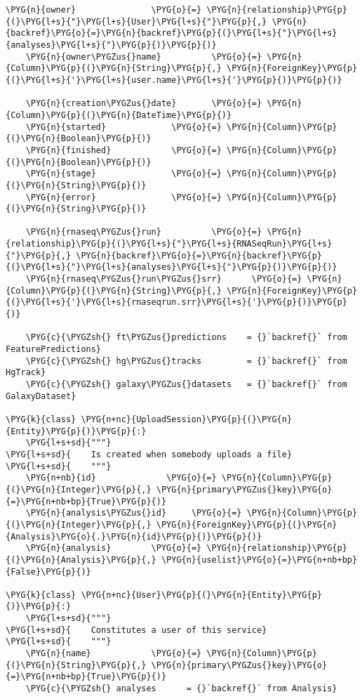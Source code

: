 \begin{Verbatim}[commandchars=\\\{\}]
    \PYG{n}{owner}               \PYG{o}{=} \PYG{n}{relationship}\PYG{p}{(}\PYG{l+s}{"}\PYG{l+s}{User}\PYG{l+s}{"}\PYG{p}{,} \PYG{n}{backref}\PYG{o}{=}\PYG{n}{backref}\PYG{p}{(}\PYG{l+s}{"}\PYG{l+s}{analyses}\PYG{l+s}{"}\PYG{p}{)}\PYG{p}{)}
    \PYG{n}{owner\PYGZus{}name}          \PYG{o}{=} \PYG{n}{Column}\PYG{p}{(}\PYG{n}{String}\PYG{p}{,} \PYG{n}{ForeignKey}\PYG{p}{(}\PYG{l+s}{'}\PYG{l+s}{user.name}\PYG{l+s}{'}\PYG{p}{)}\PYG{p}{)}

    \PYG{n}{creation\PYGZus{}date}       \PYG{o}{=} \PYG{n}{Column}\PYG{p}{(}\PYG{n}{DateTime}\PYG{p}{)}
    \PYG{n}{started}             \PYG{o}{=} \PYG{n}{Column}\PYG{p}{(}\PYG{n}{Boolean}\PYG{p}{)}
    \PYG{n}{finished}            \PYG{o}{=} \PYG{n}{Column}\PYG{p}{(}\PYG{n}{Boolean}\PYG{p}{)}
    \PYG{n}{stage}               \PYG{o}{=} \PYG{n}{Column}\PYG{p}{(}\PYG{n}{String}\PYG{p}{)}
    \PYG{n}{error}               \PYG{o}{=} \PYG{n}{Column}\PYG{p}{(}\PYG{n}{String}\PYG{p}{)}

    \PYG{n}{rnaseq\PYGZus{}run}          \PYG{o}{=} \PYG{n}{relationship}\PYG{p}{(}\PYG{l+s}{"}\PYG{l+s}{RNASeqRun}\PYG{l+s}{"}\PYG{p}{,} \PYG{n}{backref}\PYG{o}{=}\PYG{n}{backref}\PYG{p}{(}\PYG{l+s}{"}\PYG{l+s}{analyses}\PYG{l+s}{"}\PYG{p}{)}\PYG{p}{)}
    \PYG{n}{rnaseq\PYGZus{}run\PYGZus{}srr}      \PYG{o}{=} \PYG{n}{Column}\PYG{p}{(}\PYG{n}{String}\PYG{p}{,} \PYG{n}{ForeignKey}\PYG{p}{(}\PYG{l+s}{'}\PYG{l+s}{rnaseqrun.srr}\PYG{l+s}{'}\PYG{p}{)}\PYG{p}{)}

    \PYG{c}{\PYGZsh{} ft\PYGZus{}predictions    = {}`backref{}` from FeaturePredictions}
    \PYG{c}{\PYGZsh{} hg\PYGZus{}tracks         = {}`backref{}` from HgTrack}
    \PYG{c}{\PYGZsh{} galaxy\PYGZus{}datasets   = {}`backref{}` from GalaxyDataset}

\PYG{k}{class} \PYG{n+nc}{UploadSession}\PYG{p}{(}\PYG{n}{Entity}\PYG{p}{)}\PYG{p}{:}
    \PYG{l+s+sd}{"""}
\PYG{l+s+sd}{    Is created when somebody uploads a file}
\PYG{l+s+sd}{    """}
    \PYG{n+nb}{id}              \PYG{o}{=} \PYG{n}{Column}\PYG{p}{(}\PYG{n}{Integer}\PYG{p}{,} \PYG{n}{primary\PYGZus{}key}\PYG{o}{=}\PYG{n+nb+bp}{True}\PYG{p}{)}
    \PYG{n}{analysis\PYGZus{}id}     \PYG{o}{=} \PYG{n}{Column}\PYG{p}{(}\PYG{n}{Integer}\PYG{p}{,} \PYG{n}{ForeignKey}\PYG{p}{(}\PYG{n}{Analysis}\PYG{o}{.}\PYG{n}{id}\PYG{p}{)}\PYG{p}{)}
    \PYG{n}{analysis}        \PYG{o}{=} \PYG{n}{relationship}\PYG{p}{(}\PYG{n}{Analysis}\PYG{p}{,} \PYG{n}{uselist}\PYG{o}{=}\PYG{n+nb+bp}{False}\PYG{p}{)}

\PYG{k}{class} \PYG{n+nc}{User}\PYG{p}{(}\PYG{n}{Entity}\PYG{p}{)}\PYG{p}{:}
    \PYG{l+s+sd}{"""}
\PYG{l+s+sd}{    Constitutes a user of this service}
\PYG{l+s+sd}{    """}
    \PYG{n}{name}            \PYG{o}{=} \PYG{n}{Column}\PYG{p}{(}\PYG{n}{String}\PYG{p}{,} \PYG{n}{primary\PYGZus{}key}\PYG{o}{=}\PYG{n+nb+bp}{True}\PYG{p}{)}
    \PYG{c}{\PYGZsh{} analyses      = {}`backref{}` from Analysis}


\end{Verbatim}
